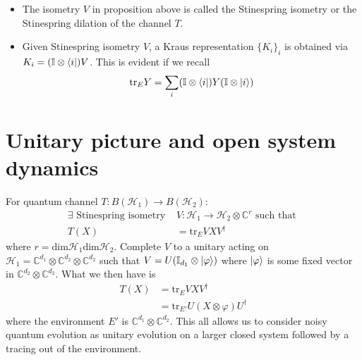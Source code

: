 \documentclass[10pt,oneside,longbibliography]{report}
\begin{document}
\begin{itemize}
    \item The isometry $V$ in proposition above is called the Stinespring isometry or the Stinespring dilation of the channel $T$. 
    \item Given Stinespring isometry $V$, a Kraus representation $\{K_i\}_i$ is obtained via $K_i=(\mathbb{I} \otimes \bra{i})V$. This is evident if we recall
    \begin{align}
        \text{tr}_E Y = \sum_i (\mathbb{I} \otimes \bra{i}) Y (\mathbb{I} \otimes \ket{i})
    \end{align}
\end{itemize}

\section{Unitary picture and open system dynamics}
For quantum channel $T: B(\mathcal{H}_1) \rightarrow B(\mathcal{H}_2)$: 
\begin{align}
    \exists \text{ Stinespring isometry } &V: \mathcal{H}_1 \rightarrow \mathcal{H}_2 \otimes \mathbb{C}^r \text{ such that } \\
    T(X)&= \text{tr}_E VXV^{\dagger}
\end{align}
where $r=\text{dim}\mathcal{H}_1\text{dim}\mathcal{H}_2$. Complete $V$ to a unitary acting on $ \mathcal{H}_1 = \mathbb{C}^{d_1} \otimes \mathbb{C}^{d_2} \otimes \mathbb{C}^{d_2}$ such that $V=U(\mathbb{I}_{d_1} \otimes \ket{\varphi})$ where $\ket{\varphi}$ is some fixed vector in $\mathbb{C}^{d_2}\otimes \mathbb{C}^{d_2}$. What we then have is 
\begin{align}
    T(X) &= \text{tr}_E VXV^{\dagger} \\
    &= \text{tr}_{E'} U(X \otimes \varphi) U^{\dagger} 
\end{align}
where the environment $E'$ is $\mathbb{C}^{d_1}\otimes \mathbb{C}^{d_2}$. This all allows us to consider noisy quantum evolution as unitary evolution on a larger closed system followed by a tracing out of the environment.

{}

\end{document}
